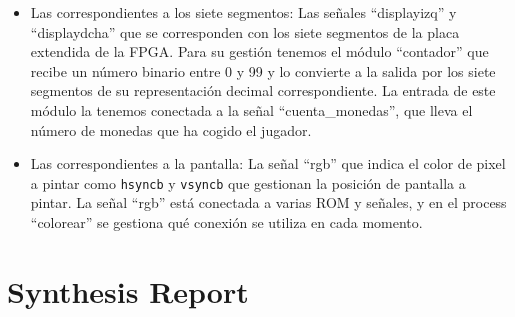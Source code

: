 \documentclass[11pt, a4paper, spanish, openright, twoside]{book}
\begin{document}
	\begin{itemize}
	\item Las correspondientes a los siete segmentos: Las señales ``displayizq'' y ``displaydcha'' que se corresponden con los siete segmentos de la placa extendida de la FPGA. Para su gestión tenemos el módulo ``contador'' que recibe un número
	binario entre 0 y 99 y lo convierte a la salida por los siete segmentos de su representación decimal correspondiente. La entrada de este módulo la tenemos conectada a la señal ``cuenta\_monedas'', que lleva el número de monedas que ha 
	cogido el jugador.
	\item Las correspondientes a la pantalla: La señal ``rgb'' que indica el color de pixel a pintar como \texttt{hsyncb} y \texttt{vsyncb} que gestionan la posición de pantalla a pintar. La señal ``rgb'' está conectada a varias ROM y señales, y en el process ``colorear'' se gestiona qué conexión se utiliza en cada momento.
	
\end{itemize}


\section{Synthesis Report}
\end{document}
